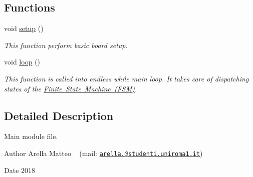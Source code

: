 \subsection*{Functions}
\begin{DoxyCompactItemize}
\item 
void \mbox{\hyperlink{group___main__group__module_ga4fc01d736fe50cf5b977f755b675f11d}{setup}} ()
\begin{DoxyCompactList}\small\item\em This function perform basic board setup. \end{DoxyCompactList}\item 
void \mbox{\hyperlink{group___main__group__module_gafe461d27b9c48d5921c00d521181f12f}{loop}} ()
\begin{DoxyCompactList}\small\item\em This function is called into endless while main loop. It takes care of dispatching states of the \mbox{\hyperlink{_f_s_m_page}{Finite State Machine (F\+SM)}}. \end{DoxyCompactList}\end{DoxyCompactItemize}


\subsection{Detailed Description}
Main module file. 

\begin{DoxyAuthor}{Author}
Arella Matteo ~\newline
 (mail\+: \href{mailto:arella.1646983@studenti.uniroma1.it}{\tt arella.@studenti.\+uniroma1.\+it}) 
\end{DoxyAuthor}
\begin{DoxyDate}{Date}
2018 
\end{DoxyDate}
